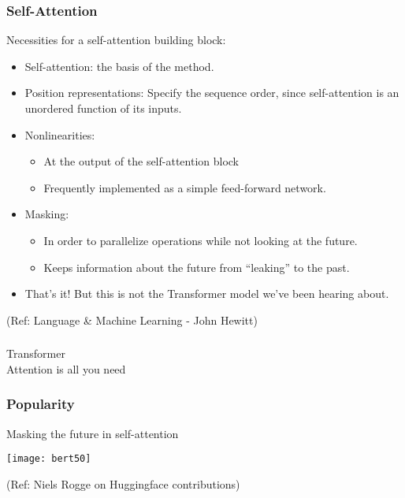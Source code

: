 \begin{frame}[fragile]\frametitle{Self-Attention}

Necessities for a self-attention building block:

\begin{itemize}
\item Self-attention:
the basis of the method.
\item Position representations:
Specify the sequence order, since self-attention is an unordered function of its  inputs.
\item Nonlinearities:
\begin{itemize}
\item At the output of the self-attention block
\item Frequently implemented as a simple feed-forward network.
\end{itemize}	 

\item Masking:
\begin{itemize}
\item In order to parallelize operations while not looking at the future.
\item Keeps information about the future from “leaking” to the past.
\end{itemize}	 

\item That’s it! But this is not the Transformer model we’ve been hearing about.


\end{itemize}	 

 
{\tiny (Ref: Language \& Machine Learning - John Hewitt)}
\end{frame}

\begin{frame}[fragile]\frametitle{}
\begin{center}
{\Large Transformer \\ \small Attention is all you need}
\end{center}
\end{frame}


\begin{frame}[fragile]\frametitle{Popularity}

Masking the future in self-attention

\begin{center}
\texttt{[image: bert50]}
\end{center}	

 
{\tiny (Ref: Niels Rogge on Huggingface contributions)}
\end{frame}


